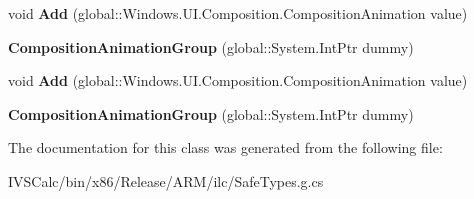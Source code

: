 \begin{DoxyCompactItemize}
void {\bfseries Add} (global\+::\+Windows.\+U\+I.\+Composition.\+Composition\+Animation value)
\item 
\mbox{\label{class_windows_1_1_u_i_1_1_composition_1_1_composition_animation_group_afd5bbec1a5f40b6a71d576200c76c622}} 
{\bfseries Composition\+Animation\+Group} (global\+::\+System.\+Int\+Ptr dummy)
\item 
\mbox{\label{class_windows_1_1_u_i_1_1_composition_1_1_composition_animation_group_af220db7bbbdb4151cb12ed7e5f6de273}} 
void {\bfseries Add} (global\+::\+Windows.\+U\+I.\+Composition.\+Composition\+Animation value)
\item 
\mbox{\label{class_windows_1_1_u_i_1_1_composition_1_1_composition_animation_group_afd5bbec1a5f40b6a71d576200c76c622}} 
{\bfseries Composition\+Animation\+Group} (global\+::\+System.\+Int\+Ptr dummy)
\end{DoxyCompactItemize}


The documentation for this class was generated from the following file\+:\begin{DoxyCompactItemize}
\item 
I\+V\+S\+Calc/bin/x86/\+Release/\+A\+R\+M/ilc/Safe\+Types.\+g.\+cs\end{DoxyCompactItemize}
